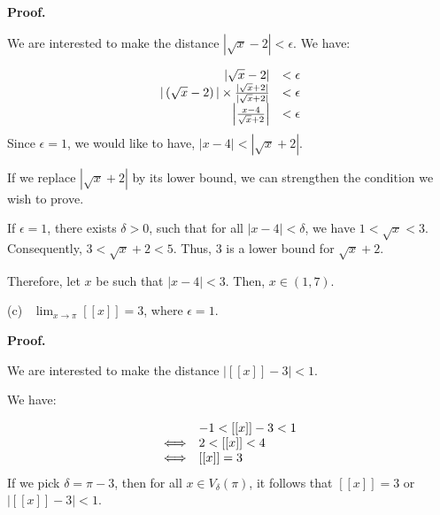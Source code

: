 \documentclass[10pt]{article}
\begin{document}
\textbf{Proof.}



We are interested to make the distance $\displaystyle |\sqrt{x} -2|< \epsilon $. We have:


\begin{equation*}
\begin{array}{ r l }
|\sqrt{x} -2| & < \epsilon \\
|\left(\sqrt{x} -2\right) |\times \frac{|\sqrt{x} +2|}{|\sqrt{x} +2|} & < \epsilon \\
\left| \frac{x-4}{\sqrt{x} +2}\right|  & < \epsilon 
\end{array}
\end{equation*}
Since $\displaystyle \epsilon =1$, we would like to have, $\displaystyle |x-4|< |\sqrt{x} +2|$. 

 

If we replace $\displaystyle |\sqrt{x} +2|$ by its lower bound, we can strengthen the condition we wish to prove.



If $\displaystyle \epsilon =1$, there exists $\displaystyle \delta  >0$, such that for all $\displaystyle |x-4|< \delta $, we have $\displaystyle 1< \sqrt{x} < 3$. Consequently, $\displaystyle 3< \sqrt{x} +2< 5$. Thus, $\displaystyle 3$ is a lower bound for $\displaystyle \sqrt{x} +2$. \ 



Therefore, let $\displaystyle x$ be such that $\displaystyle |x-4|< 3$. Then, $\displaystyle x\in ( 1,7)$.



(c) \ $\displaystyle \lim _{x\rightarrow \pi }[[ x]] =3$, where $\displaystyle \epsilon =1$. 



\textbf{Proof.}



We are interested to make the distance $\displaystyle |[[ x]] -3|< 1$.



We have:


\begin{equation*}
\begin{array}{ c l }
 & -1< [[ x]] -3< 1\\
\Longleftrightarrow  & 2< [[ x]] < 4\\
\Longleftrightarrow  & [[ x]] =3
\end{array}
\end{equation*}
 If we pick $\displaystyle \delta =\pi -3$, then for all $\displaystyle x\in V_{\delta }( \pi )$, it follows that $\displaystyle [[ x]] =3$ or $\displaystyle |[[ x]] -3|< 1$.
\end{document}
